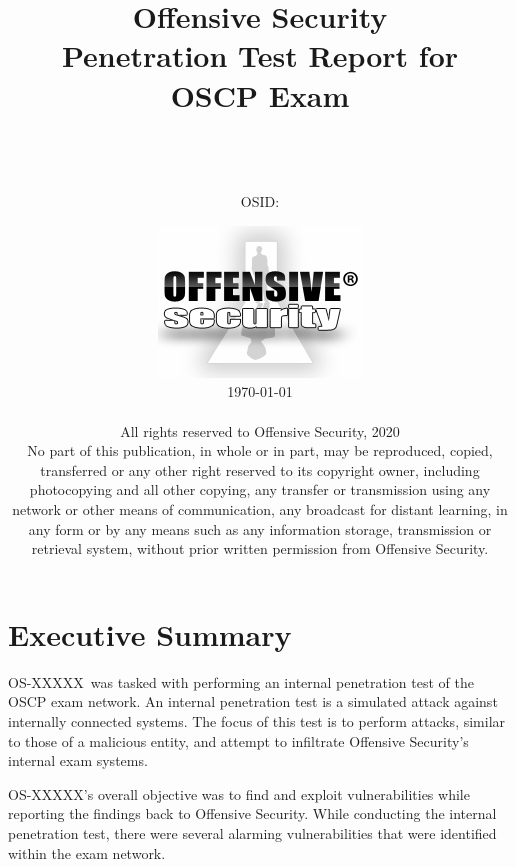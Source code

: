 \documentclass[a4paper, 10pt, oneside]{article}
\title{{\textbf{\Huge Offensive Security}}\\Penetration Test Report for\\OSCP Exam}
\author{\vspace{.8cm}\\{\LARGE \name}\\[1em]\email\\[1em]OSID: \osid}
\date{\vspace{1cm}\includegraphics{offsec_logo.png}\\\vspace{2cm} \today\\ \vspace{.25cm} \textcopyright\\\vspace{.25cm}
{\small All rights reserved to Offensive Security, 2020\\
No part of this publication, in whole or in part, may be reproduced, copied, transferred or any other right reserved to its copyright owner, including photocopying and all other copying, any transfer or transmission using any network or other means of communication, any broadcast for distant learning, in any form or by any means such as any information storage, transmission or retrieval system, without prior written permission from Offensive Security.}
}
\newcommand{\osid}{OS-XXXXX}
\newcounter{exercisecounter}
\begin{document}
\maketitle
\thispagestyle{empty}
\tableofcontents
\thispagestyle{empty}
\pagebreak 

\setcounter{exercisecounter}{0}
\newcommand{\exercisesection}{\stepcounter{exercisecounter}\subsubsection*{Chapter \theexercisecounter}}

\newcommand{\hostname}{}
\newcommand{\ip}{}
\newcommand{\tcpports}{} 
\newcommand{\udpports}{} 
\newcommand{\os}{}
\newcommand{\vuln}{}
\newcommand{\product}{}
\newcommand{\vulnx}{}
\newcommand{\productx}{}
\newcommand{\client}{\textit{kali (ZZ.ZZ.ZZ.ZZ)}}

\section{Executive Summary}
\osid\ was tasked with performing an internal penetration test of the OSCP exam network. An internal penetration test is a simulated attack against internally connected systems. The focus of this test is to perform attacks, similar to those of a malicious entity, and attempt to infiltrate Offensive Security’s internal exam systems.

\osid's overall objective was to find and exploit vulnerabilities while reporting the findings back to Offensive Security. While conducting the internal penetration test, there were several alarming vulnerabilities that were identified within the exam network. 
\end{document}
